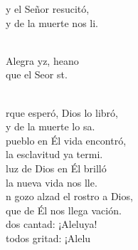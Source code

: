 \documentclass[12pt]{article}
\begin{document}
\begin{multicols*}{2}
\begin{cancion}%
	y el Señor resucitó,\\
	y de la muerte nos li. \\\jump\\
	\begin{chorus}%
	Alegra yz, heano\\
	que el Seor st.\\
	\end{chorus}%
	\jump\\
	rque esperó, Dios lo libró,\\
	y de la muerte lo sa.\\
	 pueblo en Él vida encontró,\\
	la esclavitud ya termi.\\
	 luz de Dios en Él brilló\\
	la nueva vida nos lle.\\
	n gozo alzad el rostro a Dios,\\
	que de Él nos llega vación.\\
	dos cantad: ¡Aleluya!\\
	todos gritad: ¡Alelu\\
\end{cancion}%


\end{multicols*}
\end{document}
